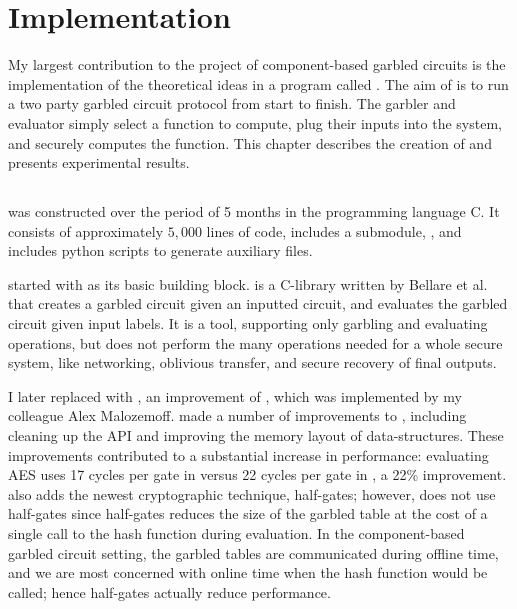 
\chapter{Implementation}

My largest contribution to the project of component-based garbled circuits is the implementation of the theoretical ideas in a program called \CompGC. 
The aim of \CompGC is to run a two party garbled circuit protocol from start to finish. 
The garbler and evaluator simply select a function to compute, plug their inputs into the system, and \CompGC securely computes the function.
This chapter describes the creation of \CompGC and presents experimental results. 

\section{\CompGC}

\CompGC was constructed over the period of 5 months in the programming language C. 
It consists of approximately $5,000$ lines of code, includes a submodule, \LibGarble, and includes python scripts to generate auxiliary files. 

\CompGC started with \JustGarble as its basic building block.
\JustGarble is a C-library written by Bellare et al. \cite{justgarble} that creates a garbled circuit given an inputted circuit, and evaluates the garbled circuit given input labels. 
It is a tool, supporting only garbling and evaluating operations, but does not perform the many operations needed for a whole secure system, like networking, oblivious transfer, and secure recovery of final outputs. 

I later replaced \JustGarble with \LibGarble, an improvement of \JustGarble, which was implemented by my colleague Alex Malozemoff.
\LibGarble made a number of improvements to \JustGarble, including cleaning up the API and improving the memory layout of  data-structures.
These improvements contributed to a substantial increase in performance: evaluating AES uses 17 cycles per gate in \LibGarble versus 22 cycles per gate in \JustGarble, a 22\% improvement. 
\LibGarble also adds the newest cryptographic technique, half-gates; however, \CompGC does not use half-gates since half-gates reduces the size of the garbled table at the cost of a single call to the hash function during evaluation. 
In the component-based garbled circuit setting, the garbled tables are communicated during offline time, and we are most concerned with online time when the hash function would be called; hence half-gates actually reduce performance.

